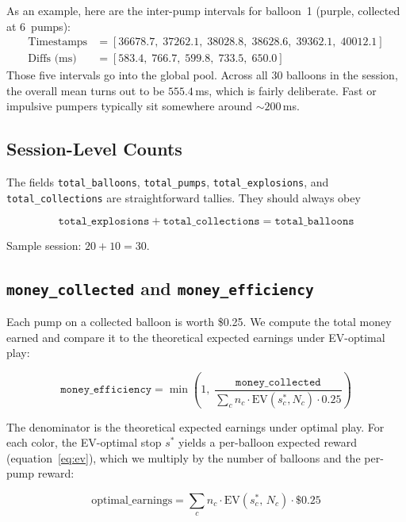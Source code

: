 \documentclass[11pt,a4paper]{article}
\begin{document}
As an example, here are the inter-pump intervals for balloon~1
(purple, collected at 6~pumps):
\begin{align*}
\text{Timestamps} &= [36678.7,\; 37262.1,\; 38028.8,\; 38628.6,\; 39362.1,\; 40012.1] \\
\text{Diffs (ms)} &= [583.4,\; 766.7,\; 599.8,\; 733.5,\; 650.0]
\end{align*}
Those five intervals go into the global pool. Across all 30 balloons in the
session, the overall mean turns out to be $555.4$\,ms, which is fairly deliberate.
Fast or impulsive pumpers typically sit somewhere around ${\sim}200$\,ms.


\subsection{Session-Level Counts}

The fields \texttt{total\_balloons}, \texttt{total\_pumps},
\texttt{total\_explosions}, and \texttt{total\_collections} are
straightforward tallies. They should always obey

\begin{equation}
    \texttt{total\_explosions} + \texttt{total\_collections} = \texttt{total\_balloons}
\end{equation}

Sample session: $20 + 10 = 30$\;\checkmark.


\subsection{\texttt{money\_collected} and \texttt{money\_efficiency}}
\label{sec:money}

Each pump on a collected balloon is worth \$0.25. We compute the total
money earned and compare it to the theoretical expected earnings under
EV-optimal play:

\begin{equation}
    \texttt{money\_efficiency} = \min\!\left(1,\;
        \frac{\texttt{money\_collected}}{\sum_c n_c \cdot \text{EV}(s^*_c, N_c) \cdot 0.25}
    \right)
\end{equation}

The denominator is the theoretical expected earnings under optimal play.
For each color, the EV-optimal stop $s^*$ yields a per-balloon expected
reward (equation~\eqref{eq:ev}), which we multiply by the number of
balloons and the per-pump reward:

\begin{equation}
    \text{optimal\_earnings} = \sum_c n_c \cdot \text{EV}(s^*_c,\, N_c) \cdot \$0.25
\end{equation}
\end{document}
